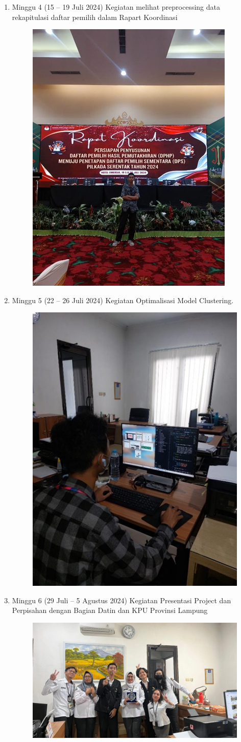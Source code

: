 \begin{enumerate}
     \item Minggu 4 (15 – 19 Juli 2024) Kegiatan melihat preprocessing data rekapitulasi daftar pemilih dalam Rapart Koordinasi
    \begin{figure}[ht]
        \centering
        \includegraphics[width=0.4\linewidth]{images/dokum-4.png}
    \end{figure}

    \newpage
     \item Minggu 5 (22 – 26 Juli 2024) Kegiatan Optimalisasi Model Clustering.
     \begin{figure}[ht]
         \centering
         \includegraphics[width=0.4\linewidth]{images/dokum-5.png}
     \end{figure}
     
     \item Minggu 6 (29 Juli – 5 Agustus 2024) Kegiatan Presentasi Project dan Perpisahan dengan Bagian Datin dan KPU Provinsi Lampung
    \begin{figure}[ht]
        \centering
        \includegraphics[width=0.4\linewidth]{images/dokum-6.png}
    \end{figure}
    
        
\end{enumerate}
